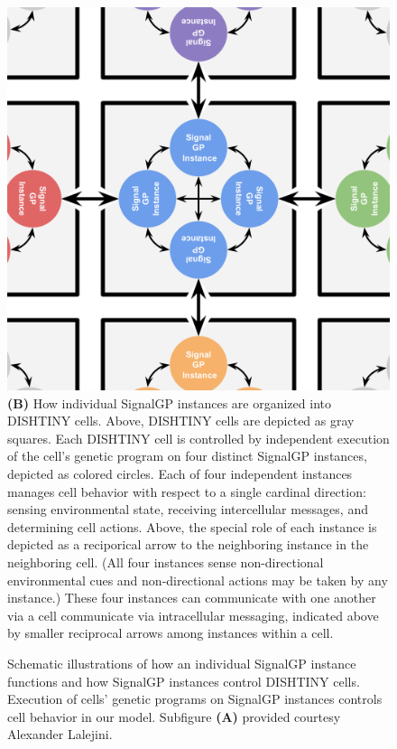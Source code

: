 \begin{figure}
\begin{center}
\begin{minipage}[t]{\linewidth}
{\hfil
\includegraphics[width=0.45\linewidth]{img/dishtinygp-cartoon}\hfil%
}\\
{\textbf{(B)}
How individual SignalGP instances are organized into DISHTINY cells.
Above, DISHTINY cells are depicted as gray squares.
Each DISHTINY cell is controlled by independent execution of the cell's genetic program on four distinct SignalGP instances, depicted as colored circles.
Each of four independent instances manages cell behavior with respect to a single cardinal direction: sensing environmental state, receiving intercellular messages, and determining cell actions.
Above, the special role of each instance is depicted as a reciporical arrow to the neighboring instance in the neighboring cell.
(All four instances sense non-directional environmental cues and non-directional actions may be taken by any instance.)
These four instances can communicate with one another via a cell communicate via intracellular messaging, indicated above by smaller reciprocal arrows among instances within a cell.
}
\end{minipage}

\caption{
Schematic illustrations of how an individual SignalGP instance functions and how SignalGP instances control DISHTINY cells.
Execution of cells' genetic programs on SignalGP instances controls cell behavior in our model.
Subfigure \textbf{(A)} provided courtesy Alexander Lalejini.
}
\label{fig:signalgp-dishtinygp}
\end{center}
\end{figure}
